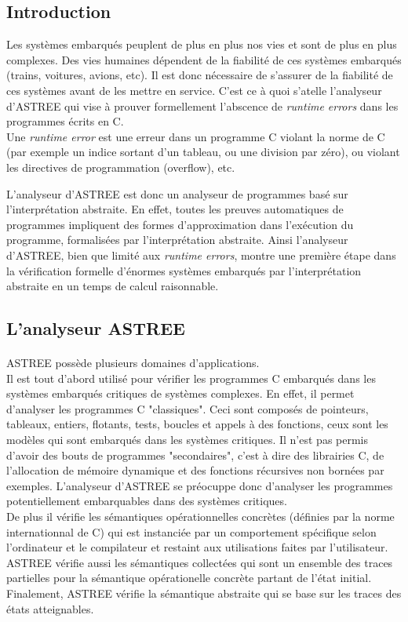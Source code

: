 \documentclass[french]{article}
\begin{document}
\subsection{Introduction}
Les systèmes embarqués peuplent de plus en plus nos vies et sont de plus en plus complexes. Des vies humaines
dépendent de la fiabilité de ces systèmes embarqués (trains, voitures, avions, etc). Il est donc nécessaire de
s'assurer de la fiabilité de ces systèmes avant de les mettre en service.
C'est ce à quoi s'atelle l'analyseur d'ASTREE qui vise à prouver formellement
l'abscence de \textit{runtime errors} dans les programmes écrits en C. \\

Une \textit{runtime error} est une erreur dans un programme C violant la norme de C (par exemple un indice sortant
d'un tableau, ou une division par zéro), ou violant les directives de programmation (overflow), etc.

L'analyseur d'ASTREE est donc un analyseur de programmes basé sur l'interprétation abstraite. En effet, toutes les preuves
automatiques de programmes impliquent des formes d'approximation dans l'exécution du programme, formalisées par
l'interprétation abstraite.
Ainsi l'analyseur d'ASTREE, bien que limité aux \textit{runtime errors}, montre une première étape
dans la vérification formelle d'énormes systèmes embarqués par l'interprétation abstraite en un temps de calcul
raisonnable.

\subsection{L'analyseur ASTREE}

\paragraph{}
ASTREE possède plusieurs domaines d'applications. \\
Il est tout d'abord utilisé pour vérifier les programmes C embarqués dans les systèmes embarqués critiques
de systèmes complexes. En effet, il permet d'analyser les programmes C "classiques". Ceci sont composés de pointeurs,
tableaux, entiers, flotants, tests, boucles et appels à des fonctions, ceux sont les modèles qui sont embarqués dans les
systèmes critiques. Il n'est pas permis d'avoir des bouts de programmes "secondaires", c'est à dire des librairies C,
de l'allocation de mémoire dynamique et des fonctions récursives non bornées par exemples. L'analyseur d'ASTREE se
préocuppe donc d'analyser les programmes potentiellement embarquables dans des systèmes critiques. \\
De plus il vérifie les sémantiques opérationnelles concrètes (définies par la norme internationnal de C) qui
est instanciée par un comportement spécifique selon l'ordinateur et le compilateur et restaint aux utilisations faites par
l'utilisateur.
ASTREE vérifie aussi les sémantiques collectées qui sont un ensemble des traces partielles pour
la sémantique opérationelle concrète partant de l'état initial. Finalement, ASTREE vérifie la sémantique abstraite
qui se base sur les traces des états atteignables.
\end{document}
